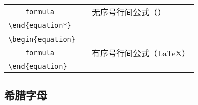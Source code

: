 \begin{table}[h!]
\begin{tabular}{l p{6em} l}
		\verb|    |{\color{gray}\verb|formula|}        && 无序号行间公式（\AmS） \\
		\verb|\end{equation*}|                         && \\
		                                               && \\
		\verb|\begin{equation}|                        && \\
		\verb|    |{\color{gray}\verb|formula|}        && 有序号行间公式（\LaTeX） \\
		\verb|\end{equation}|                          && \\
	\end{tabular}
\end{table}

\newpage
\subsection{希腊字母}

